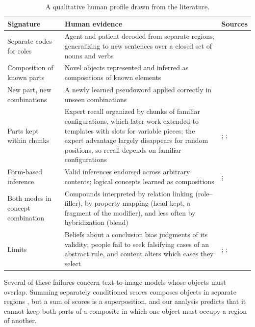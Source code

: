 \documentclass[10pt]{article}
\theoremstyle{plain}
\theoremstyle{remark}
\begin{document}
\label{app:human}
\begin{table}[h]
  \caption{A qualitative human profile drawn from the literature.}
  \label{tab:human}
  \centering\small
  \begin{tabularx}{\linewidth}{@{}P{3.3cm}YP{3.2cm}@{}}
    \toprule
    Signature & Human evidence & Sources \\
    \midrule
    Separate codes for roles & Agent and patient decoded from separate regions, generalizing to new sentences over a closed set of nouns and verbs & \citet{frankland2015} \\
    Composition of known parts & Novel objects represented and inferred as compositions of known elements & \citet{schwartenbeck2023} \\
    New part, new combinations & A newly learned pseudoword applied correctly in unseen combinations & \citet{lake2019} \\
    Parts kept within chunks & Expert recall organized by chunks of familiar configurations, which later work extended to templates with slots for variable pieces; the expert advantage largely disappears for random positions, so recall depends on familiar configurations & \citet{chase1973}; \citet{gobet1996templates}; \citet{gobet1996} \\
    Form-based inference & Valid inferences endorsed across arbitrary contents; logical concepts learned as compositions & \citet{rips1994}; \citet{piantadosi2016} \\
    Both modes in concept combination & Compounds interpreted by relation linking (role--filler), by property mapping (head kept, a fragment of the modifier), and less often by hybridization (blend) & \citet{wisniewski1997} \\
    Limits & Beliefs about a conclusion bias judgments of its validity; people fail to seek falsifying cases of an abstract rule, and content alters which cases they select & \citet{evans1983}; \citet{wason1968}; \citet{griggs1982} \\
    \bottomrule
  \end{tabularx}
\end{table}

\noindent
Several of these failures concern text-to-image models whose objects must overlap. Summing separately conditioned scores composes objects in separate regions \citep{liu2022composable}, but a sum of scores is a superposition, and our analysis predicts that it cannot keep both parts of a composite in which one object must occupy a region of another.
\end{document}
